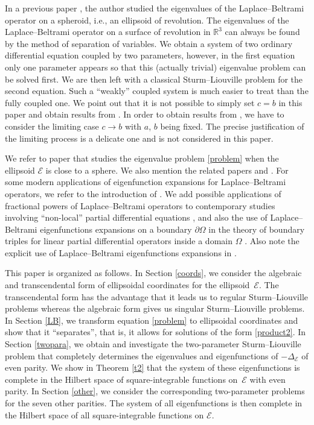 \documentclass[pdftex]{sigma}
\newcommand{\R}{\mathbb{R}}
\newcommand{\E}{\mathcal{E}}
\newcommand{\D}{\Delta_\E}
\numberwithin{equation}{section}
\begin{document}
In a previous paper \cite{V}, the author studied the eigenvalues of the Laplace--Beltrami operator on a spheroid, i.e., an ellipsoid of revolution.
The eigenvalues of the Laplace--Beltrami operator on a surface of revolution in $\R^3$ can always be found by the method of separation of variables.
We obtain a system of two ordinary differential equation coupled by two parameters, however, in the first equation only
one parameter appears so that this (actually trivial) eigenvalue problem can be solved first.
We are then left with a classical Sturm--Liouville problem for the second equation.
Such a ``weakly'' coupled system is much easier to treat than the fully coupled one.
We point out that it is not possible to simply set $c=b$ in this paper and obtain results from \cite{V}.
In order to obtain results from \cite{V}, we have to consider the limiting case $c\to b$ with $a$, $b$ being fixed.
The precise justification of the limiting process is a delicate one and is not considered in this paper.

We refer to paper \cite{EK} that studies the eigenvalue problem \eqref{problem} when the ellipsoid $\E$ is close to a sphere.
We also mention the related papers \cite{BF} and \cite{MT}.
For some modern applications of eigenfunction expansions for Laplace--Beltrami operators, we refer to the introduction of \cite{EK}.
We add possible applications of fractional powers of Laplace--Beltrami operators to contemporary studies involving ``non-local''
partial differential equations
\cite{GGL}, and also the use of Laplace--Beltrami eigenfunctions expansions on a boundary $\partial\Omega$ in the theory of boundary triples
for linear partial differential operators inside a domain $\Omega$ \cite[Theorem 3.2]{KZ}.
Also note the explicit use of Laplace--Beltrami eigenfunctions expansions in \cite[Section~1 and Theorems 2.2--2.4]{EKa}.

This paper is organized as follows. In Section \ref{coords}, we consider the algebraic and transcendental form of ellipsoidal coordinates for the ellipsoid~$\E$.
The transcendental form has the advantage that it leads us to regular Sturm--Liouville problems
whereas the algebraic form gives us singular Sturm--Liouville problems.
In Section \ref{LB}, we transform equation \eqref{problem}
to ellipsoidal coordinates
and show that it ``separates'', that is, it allows for solutions of the form \eqref{product2}.
In Section \ref{twopara}, we obtain and investigate the two-parameter Sturm--Liouville problem that
completely determines the eigenvalues and eigenfunctions of $-\D$ of even parity.
We show in Theorem \ref{t2} that the system of these eigenfunctions is complete in the Hilbert space of square-integrable functions on~$\E$ with even parity.
In Section \ref{other}, we consider the corresponding two-parameter problems for the seven other parities.
The system of all eigenfunctions is then complete in the Hilbert space of all square-integrable functions on $\E$.
\end{document}
